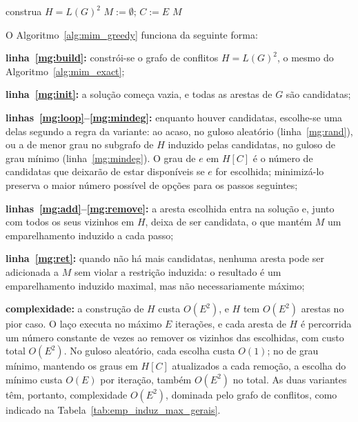 \begin{algorithm}[H]
    \DontPrintSemicolon
    \SetAlgoLined

    \caption{Heurísticas gulosas aleatória e de grau mínimo para emparelhamento induzido \cite{duckworth, halldorsson}}
    \label{alg:mim_greedy}

    construa $H = L(G)^2$\label{mg:build}\;
    $M := \emptyset$; $C := E$\label{mg:init}\;
    \KwRet $M$\label{mg:ret}\;
\end{algorithm}

O Algoritmo~\ref{alg:mim_greedy} funciona da seguinte forma:

\begin{alineas}
    \item \textbf{linha~\ref{mg:build}:} constrói-se o grafo de conflitos $H = L(G)^2$, o mesmo do Algoritmo~\ref{alg:mim_exact};
    \item \textbf{linha~\ref{mg:init}:} a solução começa vazia, e todas as arestas de $G$ são candidatas;
    \item \textbf{linhas~\ref{mg:loop}--\ref{mg:mindeg}:} enquanto houver candidatas, escolhe-se uma delas segundo a regra da variante: ao acaso, no guloso aleatório (linha~\ref{mg:rand}), ou a de menor grau no subgrafo de $H$ induzido pelas candidatas, no guloso de grau mínimo (linha~\ref{mg:mindeg}). O grau de $e$ em $H[C]$ é o número de candidatas que deixarão de estar disponíveis se $e$ for escolhida; minimizá-lo preserva o maior número possível de opções para os passos seguintes;
    \item \textbf{linhas~\ref{mg:add}--\ref{mg:remove}:} a aresta escolhida entra na solução e, junto com todos os seus vizinhos em $H$, deixa de ser candidata, o que mantém $M$ um emparelhamento induzido a cada passo;
    \item \textbf{linha~\ref{mg:ret}:} quando não há mais candidatas, nenhuma aresta pode ser adicionada a $M$ sem violar a restrição induzida: o resultado é um emparelhamento induzido maximal, mas não necessariamente máximo;
    \item \textbf{complexidade:} a construção de $H$ custa $O(E^2)$, e $H$ tem $O(E^2)$ arestas no pior caso. O laço executa no máximo $E$ iterações, e cada aresta de $H$ é percorrida um número constante de vezes ao remover os vizinhos das escolhidas, com custo total $O(E^2)$. No guloso aleatório, cada escolha custa $O(1)$; no de grau mínimo, mantendo os graus em $H[C]$ atualizados a cada remoção, a escolha do mínimo custa $O(E)$ por iteração, também $O(E^2)$ no total. As duas variantes têm, portanto, complexidade $O(E^2)$, dominada pelo grafo de conflitos, como indicado na Tabela~\ref{tab:emp_induz_max_gerais}.
\end{alineas}

